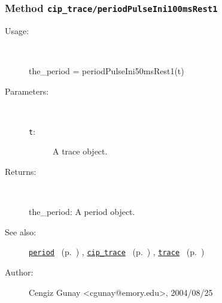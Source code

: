 \subsubsection[Method \texttt{periodPulseIni100msRest1}]{Method \texttt{cip\_trace/periodPulseIni100msRest1}}%
%
\label{ref_cip_trace__periodPulseIni100msRest1}%
\hypertarget{ref_cip_trace__periodPulseIni100msRest1}{}%
\begin{description}
%
\item[Usage:]~%
\begin{lyxcode}%
the\_period = periodPulseIni50msRest1(t)
%
\end{lyxcode}%
%
%
\item[Parameters:]~
\begin{description}%
\item[\texttt{t}:]
 A trace object.
\end{description}%
%
\item[Returns:
]~

	the\_period: A period object.
%
%
\item[See also:]%
\hyperlink{ref_period}{\texttt{period}}%
\ (p.~\pageref{ref_period})%
%
, \hyperlink{ref_cip_trace}{\texttt{cip\_trace}}%
\ (p.~\pageref{ref_cip_trace})%
%
, \hyperlink{ref_trace}{\texttt{trace}}%
\ (p.~\pageref{ref_trace})%
%
%
\item[Author:]%
Cengiz Gunay <cgunay@emory.edu>, 2004/08/25
%
\end{description}
\methodline%
